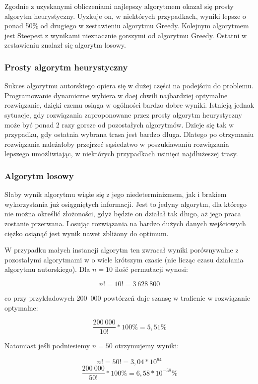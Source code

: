 Zgodnie z uzyskanymi obliczeniami najlepszy algorytmem okazał się prosty algorytm 
heurystyczny. Uyzkuje on, w niektórych przypadkach, wyniki lepsze o ponad 50\% od
drugiego w zestawieniu algorytmu Greedy. Kolejnym algorytmem jest Steepest z wynikami 
nieznacznie gorszymi od algorytmu Greedy. Ostatni w zestawieniu znalazł się algorytm 
losowy.

\subsubsection{Prosty algorytm heurystyczny}

Sukces algorytmu autorskiego opiera się w dużej części na podejściu do problemu. 
Programowanie dynamiczne wybiera w daej chwili najbardziej optymalne rozwiązanie, 
dzięki czemu osiąga w ogólności bardzo dobre wyniki. Istnieją jednak sytuacje, gdy 
rozwiązania zaproponowane przez prosty algorytm heurystyczny może być ponad 2 razy 
gorsze od pozostałych algorytmów. Dzieje się tak w przypadku, gdy ostatnia wybrana 
trasa jest bardzo długa. Dlatego po otrzymaniu rozwiązania należałoby przejrzeć 
sąsiedztwo w poszukiawaniu rozwiązania lepszego umożliwiając, w niektórych przypadkach
usinięci najdłużeszej trasy.

\subsubsection{Algorytm losowy}

Słaby wynik algorytmu wiąże się z jego niedeterminizmem, jak i brakiem wykorzystania 
już osiągniętych informacji. Jest to jedyny algorytm, dla którego nie można określić 
złożoności, gdyż będzie on działał tak długo, aż jego praca zostanie przerwana. Losując 
rozwiązania na bardzo dużych danych wejściowych ciężko osiąnąć jest wynik nawet zbliżony 
do optimum. 

W przypadku małych instancji algorytm ten zwracał wyniki porównywalne z 
pozostałymi algorytmami w o wiele krótszym czasie (nie licząc czasu działania algorytmu
autorskiego). Dla $ n = 10 $ ilość permutacji wynosi:

$$ n! = 10! = 3~628~800 $$

co przy przykładowych 200~000 powtórzeń daje szansę w trafienie w rozwiązanie optymalne:

$$ \frac{200~000}{10!} * 100\% = 5,51\%  $$

Natomiast jeśli podniesiemy $ n = 50 $ otrzymujemy wyniki:

$$ n! = 50! = 3,04 * 10^{64} $$
$$ \frac{200~000}{50!} * 100\% = 6,58 * 10^{-58}\%  $$

